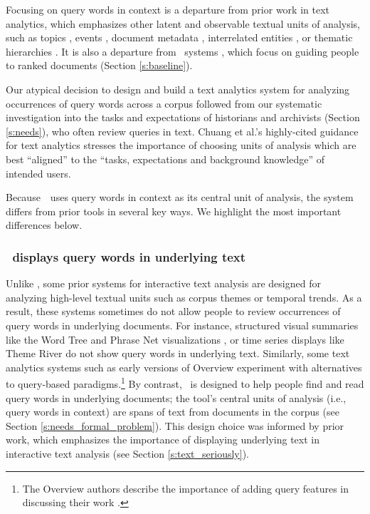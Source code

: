 Focusing on query words in context is a departure from prior work in text analytics, which emphasizes other latent and observable textual units of analysis, such as topics \cite{tiara}, events \cite{eventriver}, document metadata \cite{pivotpaths}, interrelated entities \cite{Gorg2013JigsawReflections}, or thematic hierarchies \cite{overview}.
It is also a departure from \Baselongname~systems \cite{nytwebsite,newspapers.com}, which focus on guiding people to ranked documents  (Section \ref{s:baseline}).

Our atypical decision to design and build a text analytics system for analyzing occurrences of query words across a corpus followed from our systematic investigation into the tasks and expectations of historians and archivists (Section \ref{s:needs}), who often review queries in text.
Chuang et al.'s highly-cited guidance for text analytics \cite{chuangheer} stresses the importance of choosing units of analysis which are best ``aligned'' to the ``tasks, expectations and background knowledge'' of intended users.

Because~\ours~uses query words in context as its central unit of analysis, the system differs from prior tools in several key ways. We highlight the most important differences below. 


\subsubsection{\ours~displays query words in underlying text}
Unlike \ours, some prior systems for interactive text analysis are designed for analyzing high-level textual units such as corpus themes or temporal trends.
As a result, these systems sometimes do not allow people to review occurrences of query words in underlying documents. 
For instance, structured visual summaries like the Word Tree \cite{wordtree} and Phrase Net visualizations \cite{phrasenet}, or time series displays like Theme River \cite{ThemeRiver} do not show query words in underlying text. 
Similarly, some text analytics systems such as early versions of Overview \cite{overview} experiment with alternatives to query-based paradigms.\footnote{The Overview authors describe the importance of adding query features in discussing their work \cite{overview,stray}.} 
By contrast, \ours~is designed to help people find and read query words in underlying documents; the tool's central units of analysis (i.e., query words in context) are spans of text from documents in the corpus (see Section \ref{s:needs_formal_problem}).
This design choice was informed by prior work, which emphasizes the importance of displaying underlying text in interactive text analysis (see Section \ref{s:text_seriously}).

